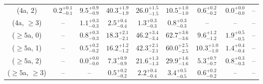 \begin{table}[h!]
{\begin{tabular}{ccccccccc}
	(4a, 2) & $0.2^{+ 0.1 }_{- 0.1 }$ & $9.5^{+ 0.9 }_{- 0.9 }$ & $40.3^{+ 1.9 }_{- 1.9 }$ & $26.0^{+ 1.5 }_{- 1.5 }$ & $10.5^{+ 1.0 }_{- 1.0 }$ & $0.6^{+ 0.2 }_{- 0.2 }$ & $0.0^{+ 0.0 }_{- 0.0 }$ & -- \\[0.5ex] 
	(4a, $\ge3$) & -- & $1.1^{+ 0.3 }_{- 0.3 }$ & $2.5^{+ 0.4 }_{- 0.4 }$ & $1.3^{+ 0.3 }_{- 0.3 }$ & $0.8^{+ 0.3 }_{- 0.3 }$ & -- & -- & -- \\[0.5ex] 
	($\ge5$a, 0) & -- & $0.8^{+ 0.3 }_{- 0.3 }$ & $18.3^{+ 2.1 }_{- 2.1 }$ & $46.2^{+ 3.4 }_{- 3.4 }$ & $62.7^{+ 3.6 }_{- 3.6 }$ & $9.6^{+ 1.2 }_{- 1.2 }$ & $1.9^{+ 0.5 }_{- 0.5 }$ & -- \\[0.5ex] 
	($\ge5$a, 1) & -- & $0.5^{+ 0.2 }_{- 0.2 }$ & $16.2^{+ 1.2 }_{- 1.2 }$ & $42.3^{+ 2.1 }_{- 2.1 }$ & $60.0^{+ 2.5 }_{- 2.5 }$ & $10.3^{+ 1.0 }_{- 1.0 }$ & $1.4^{+ 0.4 }_{- 0.4 }$ & -- \\[0.5ex] 
	($\ge5$a, 2) & -- & $0.0^{+ 0.0 }_{- 0.0 }$ & $7.3^{+ 0.9 }_{- 0.9 }$ & $21.6^{+ 1.3 }_{- 1.3 }$ & $29.9^{+ 1.6 }_{- 1.6 }$ & $5.3^{+ 0.7 }_{- 0.7 }$ & $0.8^{+ 0.3 }_{- 0.3 }$ & -- \\[0.5ex] 
	($\ge5$a, $\ge3$) & -- & -- & $0.5^{+ 0.2 }_{- 0.2 }$ & $2.2^{+ 0.4 }_{- 0.4 }$ & $3.4^{+ 0.5 }_{- 0.5 }$ & $0.6^{+ 0.2 }_{- 0.2 }$ & -- & -- \\[0.5ex] 
	\hline
	\hline
\end{tabular}}
\end{table}
